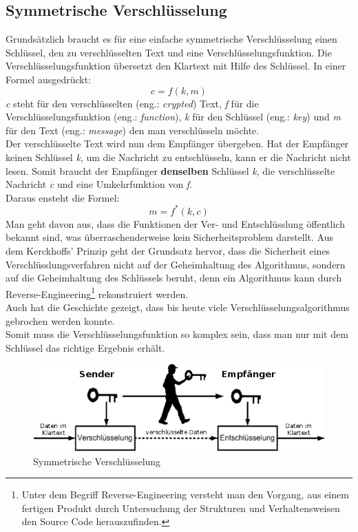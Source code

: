 \subsection{Symmetrische Verschlüsselung}
Grundsätzlich braucht es für eine einfache symmetrische Verschlüsselung einen Schlüssel, den zu verschlüsselten Text und eine Verschlüsselungsfunktion.
Die Verschlüsselungsfunktion übersetzt den Klartext mit Hilfe des Schlüssel. In einer Formel ausgedrückt:
\begin{equation*}
  c = f ( k, m )
\label{eqn:sym_versch}
\end{equation*}
\textit{c} steht für den verschlüsselten  (eng.: \textit{crypted}) Text, \textit{f} für die Verschlüsselungsfunktion (eng.: \textit{function}), \textit{k} für den Schlüssel (eng.: \textit{key}) und \textit{m} für den Text (eng.: \textit{message}) den man verschlüsseln möchte.\\
%
Der verschlüsselte Text wird nun dem Empfänger übergeben. Hat der Empfänger keinen Schlüssel \textit{k}, um die Nachricht zu entschlüsseln, kann er die Nachricht nicht lesen. Somit braucht der Empfänger \textbf{denselben} Schlüssel \textit{k}, die verschlüsselte Nachricht \textit{c} und eine Umkehrfunktion von \textit{f}.\\
Daraus ensteht die Formel:
\begin{equation*}
  m = f^*(k ,c)
\label{eqn:sym_entsch}
\end{equation*}
Man geht davon aus, dass die Funktionen der Ver- und Entschlüsslung öffentlich bekannt sind, was überraschenderweise kein Sicherheitsproblem darstellt. Aus dem Kerckhoffs' Prinzip geht der Grundsatz hervor, dass die Sicherheit eines Verschlüsslungsverfahren nicht auf der Geheimhaltung des Algorithmus, sondern auf die Geheimhaltung des Schlüssels beruht, denn ein Algorithmus kann durch Reverse-Engineering\footnote{Unter dem Begriff Reverse-Engineering versteht man den Vorgang, aus einem fertigen Produkt durch Untersuchung der Strukturen und Verhaltensweisen den Source Code herauszufinden.} rekonstruiert werden.\\
Auch hat die Geschichte gezeigt, dass bis heute viele Verschlüsselungsalgorithmus gebrochen werden konnte. \cite{mod_kry}\\
%
Somit muss die Verschlüsselungsfunktion so komplex sein, dass man nur mit dem Schlüssel das richtige Ergebnis erhält.
%
\begin{figure}[ht]
\begin{center}
\includegraphics[width=15cm]{images/symmetrischeVerschluesselung.png}
\caption{Symmetrische Verschlüsselung}
\end{center}
\end{figure}
%

